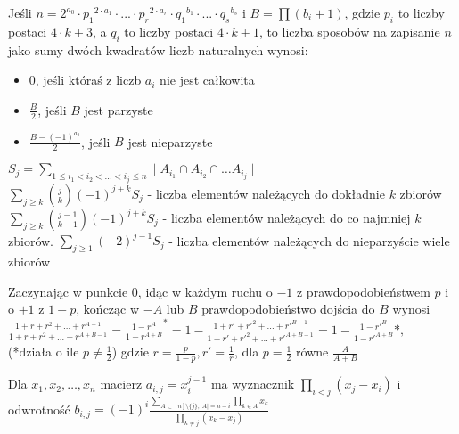 
\usepackage[utf8]{inputenc}
\usepackage{polski}
\usepackage{amsfonts}
\usepackage{amsmath,amssymb}

\DeclareMathOperator{\sech}{sech}
\DeclareMathOperator{\csch}{csch}
\DeclareMathOperator{\arcsec}{arcsec}
\DeclareMathOperator{\arccsc}{arcCsc}
\DeclareMathOperator{\arccosh}{arcCosh}
\DeclareMathOperator{\arcsinh}{arcsinh}
\DeclareMathOperator{\arctanh}{arctanh}
\DeclareMathOperator{\arcsech}{arcsech}
\DeclareMathOperator{\arccsch}{arcCsch}
\DeclareMathOperator{\arccoth}{arcCoth} 

	Jeśli $n=2^{a_0} \cdot {p_1}^{2 \cdot a_1} \cdot ... \cdot {p_r}^{2 \cdot a_r} \cdot {q_1}^{b_1} \cdot ... \cdot {q_s}^{b_s}$ i $B= \prod (b_i+1)$, gdzie $p_i$ to liczby postaci $4 \cdot k + 3$, a $q_i$ to liczby postaci $4 \cdot k + 1$, to liczba sposobów na zapisanie $n$ jako sumy dwóch kwadratów liczb naturalnych wynosi:
      \begin{itemize}
        \item 0, jeśli któraś z liczb $a_i$ nie jest całkowita
        \item $\frac{B}{2}$, jeśli $B$ jest parzyste
        \item $\frac{B-(-1)^{a_0}}{2}$, jeśli $B$ jest nieparzyste
      \end{itemize}
      
$S_j = \sum\limits_{1\leq i_1<i_2<\ldots<i_j\leq n} \mid A_{i_1}\cap A_{i_2} \cap \ldots A_{i_j} \mid$\\
$\sum\limits_{j\geq k}{j \choose k}(-1)^{j + k}S_j$ - liczba elementów należących do dokładnie $k$ zbiorów\\
$\sum\limits_{j\geq k}{j - 1 \choose k - 1}(-1)^{j + k}S_j$ - liczba elementów należących do co najmniej $k$ zbiorów.
$\sum\limits_{j\geq 1}(-2)^{j-1}S_j$ - liczba elementów należących do nieparzyście wiele zbiorów

Zaczynając w punkcie $0$, idąc w każdym ruchu o $-1$ z prawdopodobieństwem $p$ i o $+1$ z $1 - p$, kończąc w $-A$ lub $B$ prawdopodobieństwo dojścia do $B$ wynosi
$\frac{1 + r + r^2 + \ldots + r^{A - 1}}{1 + r + r^2 + \ldots + r^{A + B - 1}} = \frac{1 - r^A}{1 - r^{A + B}}^* = 1 - \frac{1 + r' + r'^2 + \ldots + r'^{B - 1}}{1 + r' + r'^2 + \ldots + r'^{A + B - 1}} = 1 - \frac{1 - r'^B}{1 - r'^{A + B}}*,$ \\ (*działa o ile $p \neq \frac12$) gdzie $r = \frac{p}{1 - p}, r' = \frac1r$, dla $p=\frac12$ równe $\frac{A}{A+B}$

Dla $x_1, x_2, \ldots, x_n$ macierz $a_{i,j}=x_i^{j - 1}$ ma wyznacznik $\prod\limits_{i<j}(x_j - x_i)$ i odwrotność
$b_{i,j} = (-1)^i\frac{\sum\limits_{A \subset [n]\setminus \lbrace j \rbrace, |A| = n - i}\prod\limits_{k \in A} x_k}{\prod\limits_{k\neq j}(x_k - x_j)}$
